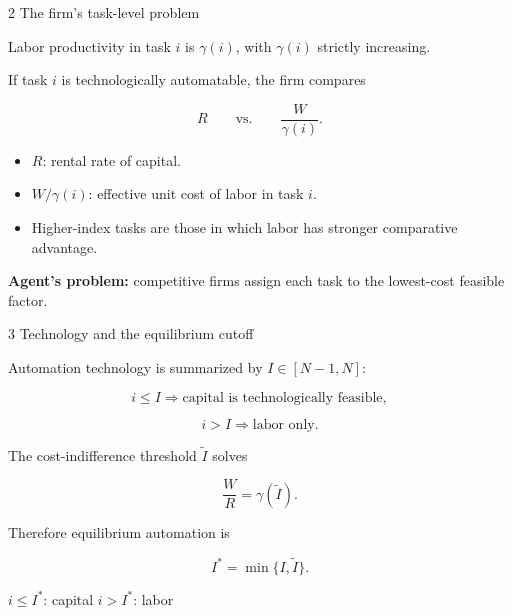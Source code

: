 \documentclass[aspectratio=169,11pt]{beamer}
\begin{document}
\begin{frame}{2 \textperiodcentered{} The firm's task-level problem}

  Labor productivity in task $i$ is $\gamma(i)$, with
  $\gamma(i)$ strictly increasing.

  \medskip

  If task $i$ is technologically automatable, the firm compares

  \[
    R
    \qquad\text{vs.}\qquad
    \frac{W}{\gamma(i)}.
  \]

  \begin{itemize}\small
    \item $R$: rental rate of capital.
    \item $W/\gamma(i)$: effective unit cost of labor in task $i$.
    \item Higher-index tasks are those in which labor has stronger
    comparative advantage.
  \end{itemize}

  \medskip

  \textbf{Agent's problem:}
  competitive firms assign each task to the lowest-cost feasible factor.

\end{frame}


\begin{frame}{3 \textperiodcentered{} Technology and the equilibrium cutoff}

  Automation technology is summarized by $I\in[N-1,N]$:

  \[
    i\le I
    \Rightarrow
    \text{capital is technologically feasible},
  \]

  \[
    i>I
    \Rightarrow
    \text{labor only}.
  \]

  The cost-indifference threshold $\widetilde I$ solves

  \[
    \frac{W}{R}=\gamma(\widetilde I).
  \]

  Therefore equilibrium automation is

  \[
    \boxed{I^*=\min\{I,\widetilde I\}}.
  \]

  \begin{center}
    \small
    $i\le I^*$: capital
    \qquad\qquad
    $i>I^*$: labor
  \end{center}

\end{frame}
\end{document}
